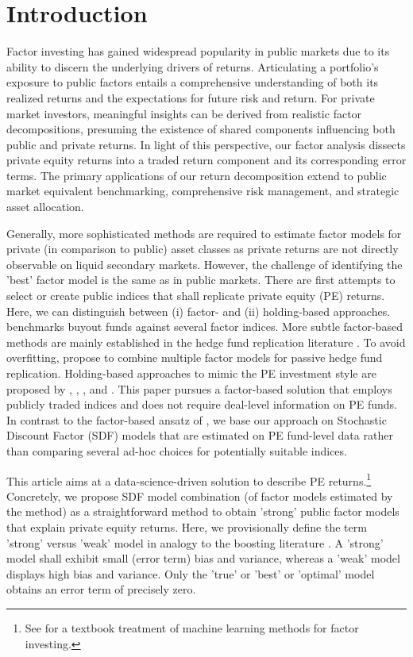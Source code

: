 \documentclass[12pt]{article}
\begin{document}
\section{Introduction}
\label{sec:factor_investing}

Factor investing has gained widespread popularity in public markets due to its ability to discern the underlying drivers of returns. 
Articulating a portfolio's exposure to public factors entails a comprehensive understanding of both its realized returns and the expectations for future risk and return. 
For private market investors, meaningful insights can be derived from realistic factor decompositions, presuming the existence of shared components influencing both public and private returns. 
In light of this perspective, our factor analysis dissects private equity returns into a traded return component and its corresponding error terms. 
The primary applications of our return decomposition extend to public market equivalent benchmarking, comprehensive risk management, and strategic asset allocation.

Generally, more sophisticated methods are required to estimate factor models for private (in comparison to public) asset classes as private returns are not directly observable on liquid secondary markets.
However, the challenge of identifying the 'best' factor model is the same as in public markets.
There are first attempts to select or create public indices that shall replicate private equity (PE) returns.
Here, we can distinguish between (i) factor- and (ii) holding-based approaches.
\cite{P14} benchmarks buyout funds against several factor indices.
More subtle factor-based methods are mainly established in the hedge fund replication literature \citep{TV08,W14}.
To avoid overfitting, \cite{OST17} propose to combine multiple factor models for passive hedge fund replication.
Holding-based approaches to mimic the PE investment style are proposed by \cite{LSSL16}, \cite{S17}, \cite{MS19}, and \cite{PP19}.
This paper pursues a factor-based solution that employs publicly traded indices and does not require deal-level information on PE funds.
In contrast to the factor-based ansatz of \cite{P14}, we base our approach on Stochastic Discount Factor (SDF) models that are estimated on PE fund-level data rather than comparing several ad-hoc choices for potentially suitable indices.

This article aims at a data-science-driven solution to describe PE returns.\footnote{See \cite{CG23} for a textbook treatment of machine learning methods for factor investing.}
Concretely, we propose SDF model combination (of factor models estimated by the \cite{DLP12} method) as a straightforward method to obtain 'strong' public factor models that explain private equity returns.
Here, we provisionally define the term 'strong' versus 'weak' model in analogy to the boosting literature \citep{S90}.
A 'strong' model shall exhibit small (error term) bias and variance, whereas a 'weak' model displays high bias and variance.
Only the 'true' or 'best' or 'optimal' model obtains an error term of precisely zero.
\end{document}
